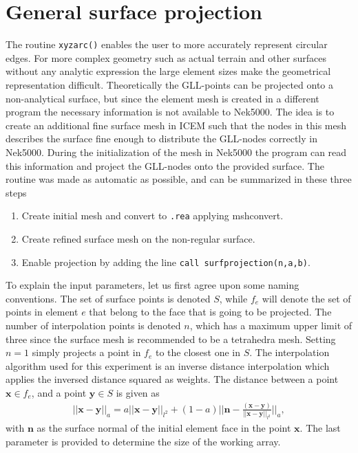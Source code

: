 \section{General surface projection}\label{surfpro}
The routine \verb|xyzarc()| enables the user to more accurately represent circular edges.
For more complex geometry such as actual terrain and other surfaces without any analytic
expression the large element sizes make the geometrical representation difficult. 
Theoretically the GLL-points can be projected onto a non-analytical surface, but since 
the element mesh is created in a different program the necessary information is not available
to Nek5000. The idea is to create an additional fine surface mesh in ICEM such
that the nodes in this mesh describes the surface fine enough to distribute the GLL-nodes correctly in Nek5000.
During the initialization of the mesh in Nek5000 the program can read this information and project the GLL-nodes onto 
the provided surface. 
The routine was made as automatic as possible, and can be summarized in these three steps
\begin{enumerate}
    \item Create initial mesh and convert to \verb|.rea| applying mshconvert.
        \item Create refined surface mesh on the non-regular surface.
        \item Enable projection by adding the line \verb|call surfprojection(n,a,b)|.
\end{enumerate}

To explain the input parameters, let us first agree upon some naming conventions. 
The set of surface points is denoted $S$, while $f_e$ will denote the set of points 
in element $e$ that belong to the face that is going to be projected.
The number of interpolation points is denoted $n$, which has a maximum upper limit of three
since the surface mesh is recommended to be a tetrahedra mesh. Setting $n=1$ simply projects 
a point in $f_e$ to the closest one in $S$.
The interpolation algorithm used for this experiment is an inverse distance interpolation
which applies the inversed distance squared as weights. The distance between a point
$\mathbf{x}\in f_e$, and a point $\mathbf{y} \in S $ is given as 
\begin{align}
    ||\mathbf{x}-\mathbf{y}||_{a} = a ||\mathbf{x}-\mathbf{y}||_{l^2}
    + (1-a)||\mathbf{n} - \frac{(\mathbf{x}-\mathbf{y})}{||\mathbf{x}-\mathbf{y}||_{l^2}}||_{a},
    \label{eq:distancenorm}
\end{align}
with $\mathbf{n}$ as the surface normal of the initial element face in the point $\mathbf{x}$.
The last parameter is provided to determine the size of the working array. 

